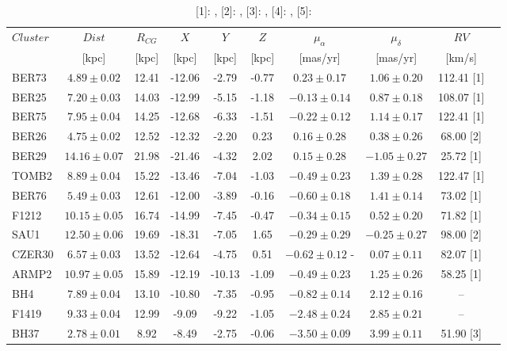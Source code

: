 \documentclass[draft]{aa}
\begin{document}
\begin{appendix}
  \begin{table}
   \caption{[1]: \cite{Tarricq_2021}, [2]: \cite{Dias_2002}, [3]:
   \cite{Soubiran_2018}, [4]: \cite{Dias_2007}, [5]: \cite{Frinchaboy_2006}}
   \label{tab:alldists}
   \centering
   \renewcommand{\arraystretch}{1.3}
   \begin{tabular}{lccccccccc}
    \hline \hline
    $Cluster$ & $Dist$ & $R_{CG}$ & $X$ & $Y$ & $Z$ & $\mu_{\alpha}$ & $\mu_{\delta}$ & $RV$\\
     & [kpc] & [kpc] & [kpc] & [kpc] & [kpc] & [mas/yr] & [mas/yr] & [km/s]\\
    \hline
    BER73 & $4.89 \pm 0.02$ & 12.41 & -12.06 & -2.79 & -0.77 & $0.23\pm 0.17$ & $1.06 \pm 0.20$ & 112.41 [1]\\
    BER25 & $7.20 \pm 0.03$& 14.03 & -12.99 & -5.15 & -1.18 & $-0.13 \pm 0.14$ & $0.87 \pm 0.18$ & 108.07 [1]\\
    BER75 & $7.95 \pm 0.04$ & 14.25 & -12.68 & -6.33 & -1.51 & $-0.22 \pm 0.12$ & $1.14 \pm 0.17$ & 122.41 [1]\\
    BER26 & $4.75 \pm 0.02$ & 12.52 & -12.32 & -2.20 & 0.23 & $0.16 \pm 0.28$ & $0.38 \pm 0.26$ & 68.00 [2]\\
    BER29 & $14.16 \pm 0.07$ & 21.98 & -21.46 & -4.32 & 2.02 & $0.15 \pm 0.28$ & $-1.05 \pm 0.27$ & 25.72 [1] \\
    TOMB2 & $8.89 \pm 0.04$ & 15.22 & -13.46 & -7.04 & -1.03 & $-0.49 \pm 0.23$ & $1.39 \pm 0.28$ & 122.47 [1]\\
    BER76 & $5.49 \pm 0.03$ & 12.61 & -12.00 & -3.89 & -0.16 & $-0.60 \pm 0.18$ & $1.41 \pm 0.14$ & 73.02 [1]\\
    F1212 & $10.15 \pm 0.05$ & 16.74 & -14.99 & -7.45 & -0.47 & $-0.34 \pm 0.15$ & $0.52 \pm 0.20$ & 71.82 [1]\\
    SAU1 & $12.50 \pm 0.06$ & 19.69 & -18.31 & -7.05 & 1.65 & $-0.29 \pm 0.29$ & $-0.25 \pm 0.27$ & 98.00 [2]\\
    CZER30 & $6.57 \pm 0.03$ & 13.52 & -12.64 & -4.75 & 0.51 & $-0.62 \pm 0.12$ -& $0.07 \pm 0.11$ & 82.07 [1]\\
    ARMP2 & $10.97 \pm 0.05$ & 15.89 & -12.19 & -10.13 & -1.09 & $-0.49 \pm 0.23$ & $1.25 \pm 0.26$ & 58.25 [1]\\
    BH4 & $7.89 \pm 0.04$ & 13.10 & -10.80 & -7.35 & -0.95 & $-0.82 \pm 0.14$ & $2.12 \pm 0.16$ & -- \\
    F1419 & $9.33 \pm 0.04$ & 12.99 & -9.09 & -9.22 & -1.05 & $-2.48 \pm 0.24$ & $2.85 \pm 0.21$ & --\\
    BH37 & $2.78 \pm 0.01$ & 8.92 & -8.49 & -2.75 & -0.06 & $-3.50 \pm 0.09$ & $3.99 \pm 0.11$ & 51.90 [3]\\

\end{tabular}
\end{table}
\end{appendix}
\end{document}

